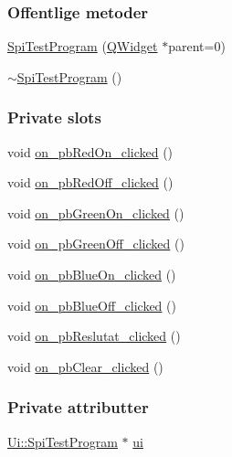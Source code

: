 \subsubsection*{Offentlige metoder}
\begin{DoxyCompactItemize}
\item 
\hyperlink{class_spi_test_program_aea7280e485f6a12d40676144c83044b7}{Spi\+Test\+Program} (\hyperlink{class_q_widget}{Q\+Widget} $\ast$parent=0)
\item 
\hyperlink{class_spi_test_program_aacfefd1f225cb5dfdade78a4fbee94bd}{$\sim$\+Spi\+Test\+Program} ()
\end{DoxyCompactItemize}
\subsubsection*{Private slots}
\begin{DoxyCompactItemize}
\item 
void \hyperlink{class_spi_test_program_acd8877e279a4f79d7300588b9628bf90}{on\+\_\+pb\+Red\+On\+\_\+clicked} ()
\item 
void \hyperlink{class_spi_test_program_a79cfbfe880f6360ab788d2dc97853d0e}{on\+\_\+pb\+Red\+Off\+\_\+clicked} ()
\item 
void \hyperlink{class_spi_test_program_aa852cac65b64df0aac74a4b95b59a62e}{on\+\_\+pb\+Green\+On\+\_\+clicked} ()
\item 
void \hyperlink{class_spi_test_program_a4b93d87c6f8a6e8eb56f69c0326906af}{on\+\_\+pb\+Green\+Off\+\_\+clicked} ()
\item 
void \hyperlink{class_spi_test_program_ac575e89a52cd7dbeb68a4f5fa4926374}{on\+\_\+pb\+Blue\+On\+\_\+clicked} ()
\item 
void \hyperlink{class_spi_test_program_ada4246a223bc5273c0c53cd993203932}{on\+\_\+pb\+Blue\+Off\+\_\+clicked} ()
\item 
void \hyperlink{class_spi_test_program_acc0c70df85267b31e29c790ca2806895}{on\+\_\+pb\+Reslutat\+\_\+clicked} ()
\item 
void \hyperlink{class_spi_test_program_a5ca1e8292a9ae7b699e6395619650a95}{on\+\_\+pb\+Clear\+\_\+clicked} ()
\end{DoxyCompactItemize}
\subsubsection*{Private attributter}
\begin{DoxyCompactItemize}
\item 
\hyperlink{class_ui_1_1_spi_test_program}{Ui\+::\+Spi\+Test\+Program} $\ast$ \hyperlink{class_spi_test_program_aeb2a16d7ad7ec0f4e767355e60efcf05}{ui}
\end{DoxyCompactItemize}


